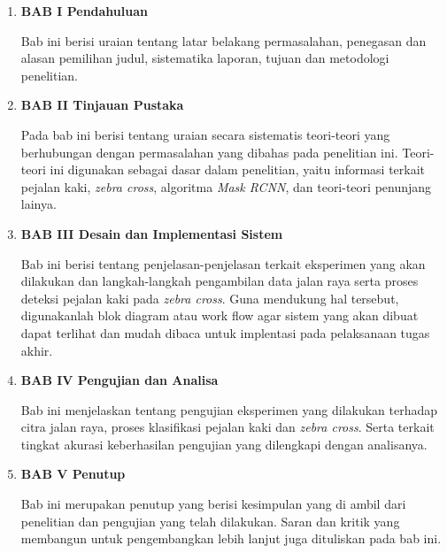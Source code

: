 \begin{enumerate}[nolistsep]

  \item \textbf{BAB I Pendahuluan}

  Bab ini berisi uraian tentang latar belakang permasalahan, penegasan dan alasan pemilihan judul, sistematika laporan, tujuan dan metodologi penelitian.

  \vspace{2ex}

  \item \textbf{BAB II Tinjauan Pustaka}

  Pada bab ini berisi tentang uraian secara sistematis teori-teori yang berhubungan dengan permasalahan yang dibahas pada penelitian ini. Teori-teori ini digunakan sebagai dasar dalam penelitian, yaitu informasi terkait pejalan kaki, \textit{zebra cross}, algoritma \textit{Mask RCNN}, dan teori-teori penunjang lainya.

  \vspace{2ex}

  \item \textbf{BAB III Desain dan Implementasi Sistem}

  Bab ini berisi tentang penjelasan-penjelasan terkait eksperimen yang akan dilakukan dan langkah-langkah pengambilan data jalan raya serta proses deteksi pejalan kaki pada \textit{zebra cross}. Guna mendukung hal tersebut, digunakanlah blok diagram atau work flow agar sistem yang akan dibuat dapat terlihat dan mudah dibaca untuk implentasi pada pelaksanaan tugas akhir.

  \vspace{2ex}

  \item \textbf{BAB IV Pengujian dan Analisa}

  Bab ini menjelaskan tentang pengujian eksperimen yang dilakukan terhadap citra jalan raya, proses klasifikasi pejalan kaki dan \textit{zebra cross}. Serta terkait tingkat akurasi keberhasilan pengujian yang dilengkapi dengan analisanya.

  \vspace{2ex}

  \item \textbf{BAB V Penutup}

  Bab ini merupakan penutup yang berisi kesimpulan yang di ambil dari penelitian dan pengujian yang telah dilakukan. Saran dan kritik yang membangun untuk pengembangkan lebih lanjut juga dituliskan pada bab ini.

\end{enumerate}
